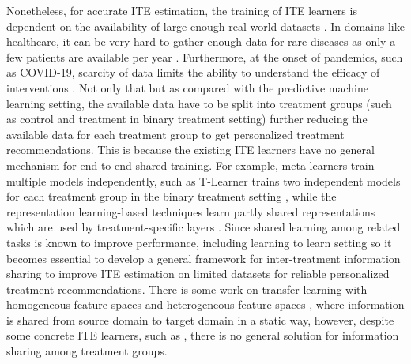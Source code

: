 \documentclass{article}
\begin{document}
Nonetheless, for accurate ITE estimation, the training of ITE learners is dependent on the availability of large enough real-world datasets \cite{bica2022transfer}. In domains like healthcare, it can be very hard to gather enough data for rare diseases as only a few patients are available per year \cite{wiens2014study}. Furthermore, at the onset of pandemics, such as COVID-19, scarcity of data limits the ability to understand the efficacy of interventions \cite{qian2020between}. Not only that but as compared with the predictive machine learning setting, the available data have to be split into treatment groups (such as control and treatment in binary treatment setting) further reducing the available data for each treatment group to get personalized treatment recommendations. This is because the existing ITE learners have no general mechanism for end-to-end shared training.
For example, meta-learners train multiple models independently, such as T-Learner trains two independent models for each treatment group in the binary treatment setting \cite{kunzel2019metalearners}, while the representation learning-based techniques learn partly shared representations which are used by treatment-specific layers \cite{shi2019adapting}. Since shared learning among related tasks is known to improve performance, including learning to learn setting \cite{aloui2023transfer,maurer2016benefit} so it becomes essential to develop a general framework for inter-treatment information sharing to improve ITE estimation on limited datasets for reliable personalized treatment recommendations. There is some work on transfer learning with homogeneous feature spaces \cite{kunzel2018transfer} and heterogeneous feature spaces \cite{bica2022transfer}, where information is shared from source domain to target domain in a static way, however, despite some concrete ITE learners, such as \cite{curth2021inductive}, there is no general solution for information sharing among treatment groups.
\end{document}
